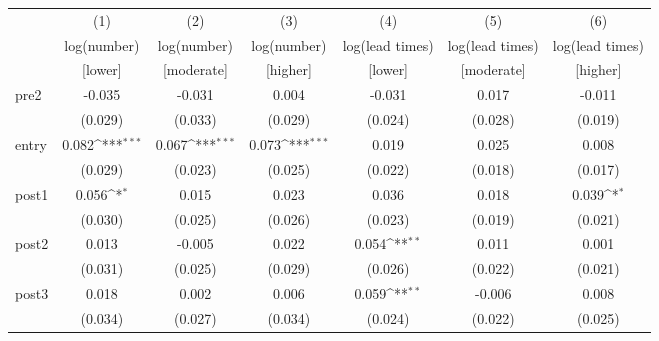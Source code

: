 {
\def\sym#1{\ifmmode^{#1}\else\(^{#1}\)\fi}
\begin{adjustbox}{max width=\textwidth}
\begin{tabular}{l*{6}{c}}
\toprule
            &\multicolumn{1}{c}{(1)}&\multicolumn{1}{c}{(2)}&\multicolumn{1}{c}{(3)}&\multicolumn{1}{c}{(4)}&\multicolumn{1}{c}{(5)}&\multicolumn{1}{c}{(6)}\\
            &\multicolumn{1}{c}{log(number)}&\multicolumn{1}{c}{log(number)}&\multicolumn{1}{c}{log(number)}&\multicolumn{1}{c}{log(lead times)}&\multicolumn{1}{c}{log(lead times)}&\multicolumn{1}{c}{log(lead times)}\\
            &[lower]&[moderate]&[higher]&[lower]&[moderate]&[higher]\\
\midrule
pre2        &      -0.035         &      -0.031         &       0.004         &      -0.031         &       0.017         &      -0.011         \\
            &     (0.029)         &     (0.033)         &     (0.029)         &     (0.024)         &     (0.028)         &     (0.019)         \\
\addlinespace
entry       &       0.082\sym{***}&       0.067\sym{***}&       0.073\sym{***}&       0.019         &       0.025         &       0.008         \\
            &     (0.029)         &     (0.023)         &     (0.025)         &     (0.022)         &     (0.018)         &     (0.017)         \\
\addlinespace
post1       &       0.056\sym{*}  &       0.015         &       0.023         &       0.036         &       0.018         &       0.039\sym{*}  \\
            &     (0.030)         &     (0.025)         &     (0.026)         &     (0.023)         &     (0.019)         &     (0.021)         \\
\addlinespace
post2       &       0.013         &      -0.005         &       0.022         &       0.054\sym{**} &       0.011         &       0.001         \\
            &     (0.031)         &     (0.025)         &     (0.029)         &     (0.026)         &     (0.022)         &     (0.021)         \\
\addlinespace
post3       &       0.018         &       0.002         &       0.006         &       0.059\sym{**} &      -0.006         &       0.008         \\
            &     (0.034)         &     (0.027)         &     (0.034)         &     (0.024)         &     (0.022)         &     (0.025)         \\

\end{tabular}
\end{adjustbox}}
